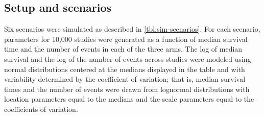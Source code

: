 \documentclass[11pt,final,fleqn]{article}\usepackage[]{graphicx}\usepackage[]{color}
\begin{document}
\subsection{Setup and scenarios}
Six scenarios were simulated as described in \autoref{tbl:sim-scenarios}. For each scenario, parameters for 10,000 studies were generated as a function of median survival time and the number of events in each of the three arms. The log of median survival and the log of the number of events across studies were modeled using normal distributions centered at the medians displayed in the table and with variability determined by the coefficient of variation; that is, median survival times and the number of events were drawn from lognormal distributions with location parameters equal to the medians and the scale parameters equal to the coefficients of variation.
\end{document}
